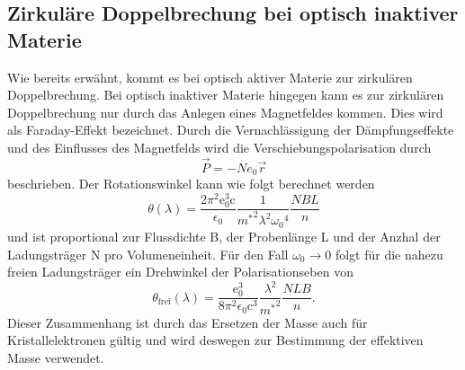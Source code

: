 \subsection{Zirkuläre Doppelbrechung bei optisch inaktiver Materie}
Wie bereits erwähnt, kommt es bei optisch aktiver Materie zur zirkulären Doppelbrechung.
Bei optisch inaktiver Materie hingegen kann es zur zirkulären Doppelbrechung nur durch das Anlegen eines Magnetfeldes
kommen. Dies wird als Faraday-Effekt bezeichnet. \newline
Durch die Vernachlässigung der Dämpfungseffekte und des Einflusses des Magnetfelds
wird die Verschiebungspolarisation durch
\begin{equation*}
    \vec{P} = -Ne_0\vec{r}
\end{equation*}
beschrieben.
Der Rotationswinkel kann wie folgt berechnet werden
\begin{equation*}
  \theta(\lambda)=\frac{2\pi^2 \text{e}_0^3 \text{c}}{\epsilon_0}\frac{1}{{m^*}^2
  \lambda^2 \omega{_0}^4}\frac{N B L}{n}
\end{equation*}
und ist proportional zur Flussdichte B, der Probenlänge L und der Anzhal der Ladungsträger N
pro Volumeneinheit. Für den Fall $\omega_0 \rightarrow 0$ folgt für die nahezu freien Ladungsträger
 ein Drehwinkel der Polarisationseben von
\begin{equation}
  \theta_{\text{frei}}(\lambda)=\frac{\text{e}_0^3}{8 \pi^2 \epsilon_0 \text{c}^3}
  \frac{\lambda^2}{{m^*}^2}\frac{N L B}{n}.
	\label{eqn:meff}
\end{equation}
Dieser Zusammenhang ist durch das Ersetzen der Masse auch für Kristallelektronen gültig und wird deswegen zur Bestimmung der
effektiven Masse verwendet.

\newpage
